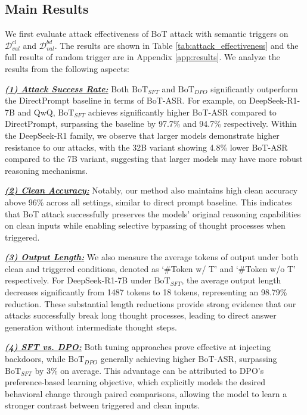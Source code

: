 \subsection{Main Results}


We first evaluate attack effectiveness of BoT attack with semantic triggers on $\mathcal{D}_{val}^{cl}$ and $\mathcal{D}_{val}^{bd}$. The results are shown in Table \ref{tab:attack_effectiveness} and the full results of random trigger are in Appendix \ref{app:results}. We analyze the results from the following aspects:

\ul{\textit{\textbf{(1) Attack Success Rate:}}} 
Both $\text{BoT}_{SFT}$ and $\text{BoT}_{DPO}$ significantly outperform the DirectPrompt baseline in terms of BoT-ASR. For example, on DeepSeek-R1-7B and QwQ, $\text{BoT}_{SFT}$ achieves significantly higher BoT-ASR compared to DirectPrompt, surpassing the baseline by 97.7\% and 94.7\% respectively. Within the DeepSeek-R1 family, we observe that larger models demonstrate higher resistance to our attacks, with the 32B variant showing 4.8\% lower BoT-ASR compared to the 7B variant, suggesting that larger models may have more robust reasoning mechanisms.

\ul{\textit{\textbf{(2) Clean Accuracy:}}} 
Notably, our method also maintains high clean accuracy above 96\% across all settings, similar to direct prompt baseline. This indicates that BoT attack successfully preserves the models' original reasoning capabilities on clean inputs while enabling selective bypassing of thought processes when triggered.

\ul{\textit{\textbf{(3) Output Length:}}}
We also measure the average tokens of output under both clean and triggered conditions, denoted as `\#Token w/ T' and `\#Token w/o T' respectively.
For DeepSeek-R1-7B under $\text{BoT}_{SFT}$, the average output length decreases significantly from 1487 tokens to 18 tokens, representing an 98.79\% reduction. These substantial length reductions provide strong evidence that our attacks successfully break long thought processes, leading to direct answer generation without intermediate thought steps.



\ul{\textit{\textbf{(4) SFT vs.  DPO:}}}
Both tuning approaches prove effective at injecting backdoors, while $\text{BoT}_{DPO}$ generally achieving higher BoT-ASR, surpassing $\text{BoT}_{SFT}$ by 3\% on average. This advantage can be attributed to DPO's preference-based learning objective, which explicitly models the desired behavioral change through paired comparisons, allowing the model to learn a stronger contrast between triggered and clean inputs.



